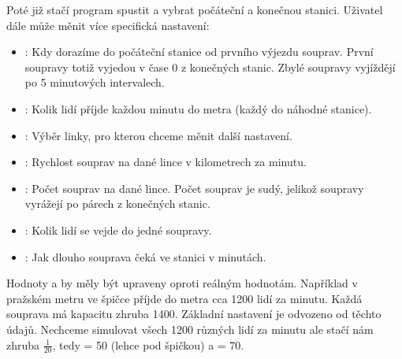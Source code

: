 \documentclass[12pt, a4paper]{article}
\begin{document}
Poté již stačí program spustit a vybrat počáteční a konečnou stanici. Uživatel dále může měnit více specifická nastavení:
\begin{itemize}
    \item {}: Kdy dorazíme do počáteční stanice od prvního výjezdu souprav. První soupravy totiž vyjedou v čase 0 z konečných stanic. Zbylé soupravy vyjíždějí po 5 minutových intervalech.
    \item {}: Kolik lidí příjde každou minutu do metra (každý do náhodné stanice).
    \item {}: Výběr linky, pro kterou chceme měnit další nastavení.
    \item {}: Rychlost souprav na dané lince v kilometrech za minutu.
    \item {}: Počet souprav na dané lince. Počet souprav je sudý, jelikož soupravy vyrážejí po párech z konečných stanic.
    \item {}: Kolik lidí se vejde do jedné soupravy.
    \item {}: Jak dlouho souprava čeká ve stanici v minutách.
\end{itemize}

Hodnoty  a  by měly být upraveny oproti reálným hodnotám. Například v pražském metru ve špičce příjde do metra cca 1200 lidí za minutu. Každá souprava má kapacitu zhruba 1400. Základní nastavení je odvozeno od těchto údajů. Nechceme simulovat všech 1200 různých lidí za minutu ale stačí nám zhruba $\frac{1}{20}$, tedy  = 50 (lehce pod špičkou) a  = 70.
\end{document}
